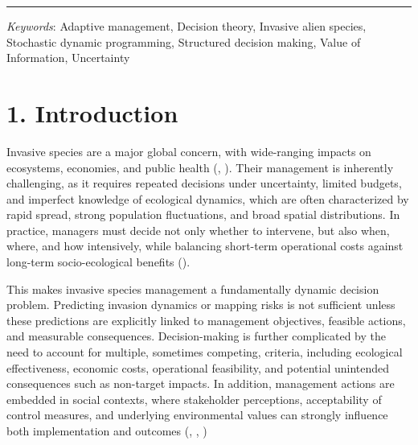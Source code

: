 \documentclass[
  11pt,
  a4paper,
]{article}
\begin{document}
\vspace{3mm}
\hrule
\vspace{5mm}

\emph{Keywords}: Adaptive management, Decision theory, Invasive alien species, Stochastic dynamic programming, Structured decision making, Value of Information, Uncertainty

\newpage

\section{1. Introduction}\label{introduction}

Invasive species are a major global concern, with wide-ranging impacts on ecosystems, economies, and public health (, ). Their management is inherently challenging, as it requires repeated decisions under uncertainty, limited budgets, and imperfect knowledge of ecological dynamics, which are often characterized by rapid spread, strong population fluctuations, and broad spatial distributions. In practice, managers must decide not only whether to intervene, but also when, where, and how intensively, while balancing short-term operational costs against long-term socio-ecological benefits ().

This makes invasive species management a fundamentally dynamic decision problem. Predicting invasion dynamics or mapping risks is not sufficient unless these predictions are explicitly linked to management objectives, feasible actions, and measurable consequences. Decision-making is further complicated by the need to account for multiple, sometimes competing, criteria, including ecological effectiveness, economic costs, operational feasibility, and potential unintended consequences such as non-target impacts. In addition, management actions are embedded in social contexts, where stakeholder perceptions, acceptability of control measures, and underlying environmental values can strongly influence both implementation and outcomes (, , )
\end{document}
